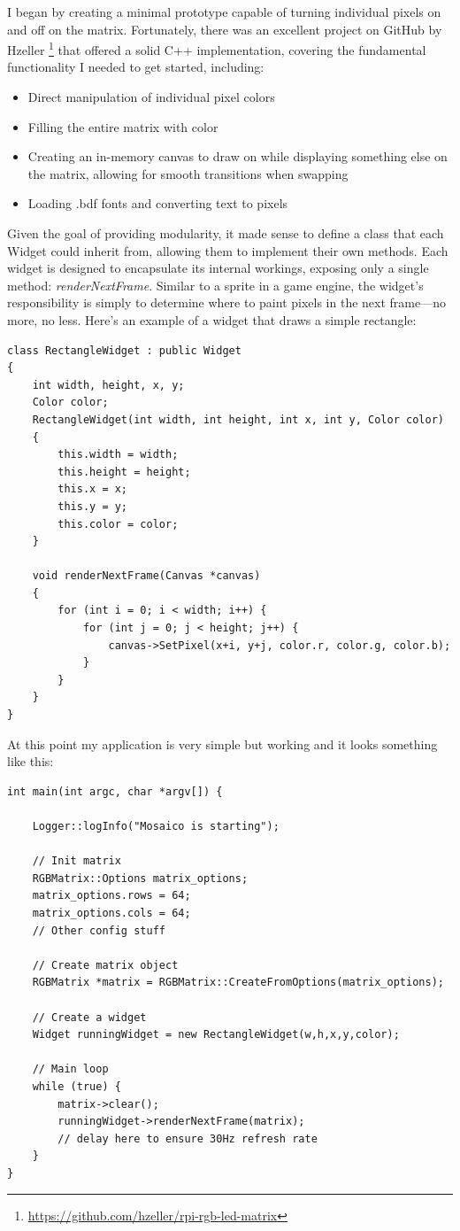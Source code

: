 I began by creating a minimal prototype capable of turning individual pixels on and off on the matrix. Fortunately, there was an excellent project on GitHub by Hzeller \footnote{\url{https://github.com/hzeller/rpi-rgb-led-matrix}} that offered a solid C++ implementation, covering the fundamental functionality I needed to get started, including: \begin{itemize} \item Direct manipulation of individual pixel colors \item Filling the entire matrix with color \item Creating an in-memory canvas to draw on while displaying something else on the matrix, allowing for smooth transitions when swapping \item Loading .bdf fonts and converting text to pixels \end{itemize}

Given the goal of providing modularity, it made sense to define a class that each Widget could inherit from, allowing them to implement their own methods. 
Each widget is designed to encapsulate its internal workings, exposing only a single method: \textit{renderNextFrame}. Similar to a sprite in a game engine, the widget’s responsibility is simply to determine where to paint pixels in the next frame—no more, no less. Here’s an example of a widget that draws a simple rectangle:

\begin{verbatim}
class RectangleWidget : public Widget
{
    int width, height, x, y;
    Color color;
    RectangleWidget(int width, int height, int x, int y, Color color)
    {
        this.width = width;
        this.height = height;
        this.x = x;
        this.y = y;
        this.color = color;
    }

    void renderNextFrame(Canvas *canvas)
    {
        for (int i = 0; i < width; i++) {
            for (int j = 0; j < height; j++) {
                canvas->SetPixel(x+i, y+j, color.r, color.g, color.b);
            }
        }
    }
}
\end{verbatim}
\newpage
At this point my application is very simple but working and it looks something like this:

\begin{verbatim}
int main(int argc, char *argv[]) {

    Logger::logInfo("Mosaico is starting");

    // Init matrix
    RGBMatrix::Options matrix_options;
    matrix_options.rows = 64;
    matrix_options.cols = 64;
    // Other config stuff

    // Create matrix object
    RGBMatrix *matrix = RGBMatrix::CreateFromOptions(matrix_options);

    // Create a widget
    Widget runningWidget = new RectangleWidget(w,h,x,y,color);

    // Main loop
    while (true) {
        matrix->clear();
        runningWidget->renderNextFrame(matrix);
        // delay here to ensure 30Hz refresh rate
    }
}
\end{verbatim}
